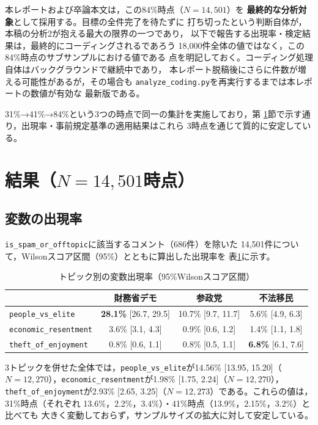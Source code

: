 \documentclass[dvipdfmx, a4paper, 11pt]{jsarticle}
\begin{document}
本レポートおよび卒論本文は，この84\%時点（$N=14{,}501$）を
\textbf{最終的な分析対象}として採用する。目標の全件完了を待たずに
打ち切ったという判断自体が，本稿の分析2が抱える最大の限界の一つであり，
以下で報告する出現率・検定結果は，最終的にコーディングされるであろう
18{,}000件全体の値ではなく，この84\%時点のサブサンプルにおける値である
点を明記しておく。コーディング処理自体はバックグラウンドで継続中であり，
本レポート脱稿後にさらに件数が増える可能性があるが，その場合も
\texttt{analyze\_coding.py}を再実行するまでは本レポートの数値が有効な
最新版である。

31\%→41\%→84\%という3つの時点で同一の集計を実施しており，第
\ref{sec:results}節で示す通り，出現率・事前規定基準の適用結果はこれら
3時点を通じて質的に安定している。

\section{結果（$N=14{,}501$時点）}
\label{sec:results}

\subsection{変数の出現率}
\texttt{is\_spam\_or\_offtopic}に該当するコメント（686件）を除いた
14{,}501件について，Wilsonスコア区間（95\%）とともに算出した出現率を
表\ref{tab:prevalence}に示す。

\begin{table}[H]
\centering
\caption{トピック別の変数出現率（95\%Wilsonスコア区間）}
\label{tab:prevalence}
\begin{tabular}{lccc}
\toprule
 & 財務省デモ & 参政党 & 不法移民 \\
\midrule
\texttt{people\_vs\_elite} & \textbf{28.1\%} [26.7, 29.5] & 10.7\% [9.7, 11.7] & 5.6\% [4.9, 6.3] \\
\texttt{economic\_resentment} & 3.6\% [3.1, 4.3] & 0.9\% [0.6, 1.2] & 1.4\% [1.1, 1.8] \\
\texttt{theft\_of\_enjoyment} & 0.8\% [0.6, 1.1] & 0.8\% [0.5, 1.1] & \textbf{6.8\%} [6.1, 7.6] \\
\bottomrule
\end{tabular}
\end{table}

3トピックを併せた全体では，\texttt{people\_vs\_elite}が14.56\%
[13.95, 15.20]（$N=12{,}270$），\texttt{economic\_resentment}が1.98\%
[1.75, 2.24]（$N=12{,}270$），\texttt{theft\_of\_enjoyment}が2.93\%
[2.65, 3.25]（$N=12{,}273$）である。これらの値は，31\%時点（それぞれ
13.6\%，2.2\%，3.4\%）・41\%時点（13.9\%，2.15\%，3.2\%）と比べても
大きく変動しておらず，サンプルサイズの拡大に対して安定している。
\end{document}
